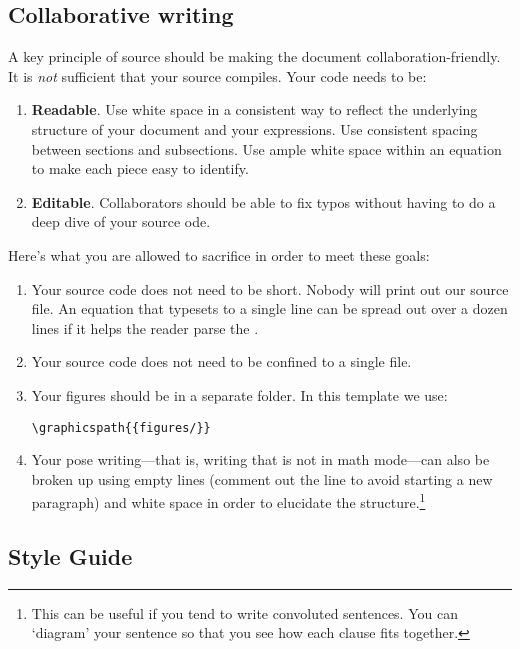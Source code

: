 \subsection{Collaborative writing}

A key principle of \LaTeXx source should be making the document collaboration-friendly. It is \emph{not} sufficient that your \LaTeXx source compiles. Your code needs to be:
\begin{enumerate}
	\item \textbf{Readable}. Use white space in a consistent way to reflect the underlying structure of your document and your expressions. Use consistent spacing between sections and subsections. Use ample white space within an equation to make each piece easy to identify. 
	\item \textbf{Editable}. Collaborators should be able to fix typos without having to do a deep dive of your source ode. 
\end{enumerate}
Here's what you are allowed to sacrifice in order to meet these goals:
\begin{enumerate}
	\item Your source code does not need to be short. Nobody will print out our source file. An equation that typesets to a single line can be spread out over a dozen lines if it helps the reader parse the \LaTeXx. 
	\item Your source code does not need to be confined to a single file. 
	\item Your figures should be in a separate folder. In this template we use:
% 
\begin{lstlisting}[style=latexstyle]
\graphicspath{{figures/}}
\end{lstlisting}
% 
	\item Your pose writing---that is, writing that is not in math mode---can also be broken up using empty lines (comment out the line to avoid starting a new paragraph) and white space in order to elucidate the structure.\footnote{This can be useful if you tend to write convoluted sentences. You can `diagram' your sentence so that you see how each clause fits together.}
\end{enumerate}


\subsection{\texorpdfstring{\LaTeXx Style Guide}{LaTeX Style Guide}}

